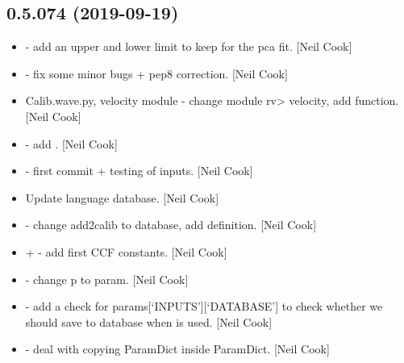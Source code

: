\documentclass[a4paper,10pt,english]{report}
\begin{document}
\subsection{0.5.074 (2019-09-19)}
\label{\detokenize{misc/changelog:id69}}\begin{itemize}
\item {} 
 - add an upper and lower limit to keep for
the pca fit. {[}Neil Cook{]}

\item {} 
 - fix some minor bugs + pep8 correction.
{[}Neil Cook{]}

\item {} 
Calib.wave.py, velocity module - change module rv\textendash{}\textgreater{} velocity, add
 function. {[}Neil Cook{]}

\item {} 
 - add . {[}Neil Cook{]}

\item {} 
 - first commit + testing of inputs.
{[}Neil Cook{]}

\item {} 
Update language database. {[}Neil Cook{]}

\item {} 
 - change \textendash{}add2calib to
\textendash{}database, add  definition. {[}Neil Cook{]}

\item {} 
 +  - add
first CCF constants. {[}Neil Cook{]}

\item {} 
 - change p to param. {[}Neil Cook{]}

\item {} 
 - add a check for
params{[}‘INPUTS’{]}{[}‘DATABASE’{]} to check whether we should save to
database when  is used. {[}Neil Cook{]}

\item {} 
 - deal with copying ParamDict inside
ParamDict. {[}Neil Cook{]}


\end{itemize}
\end{document}

